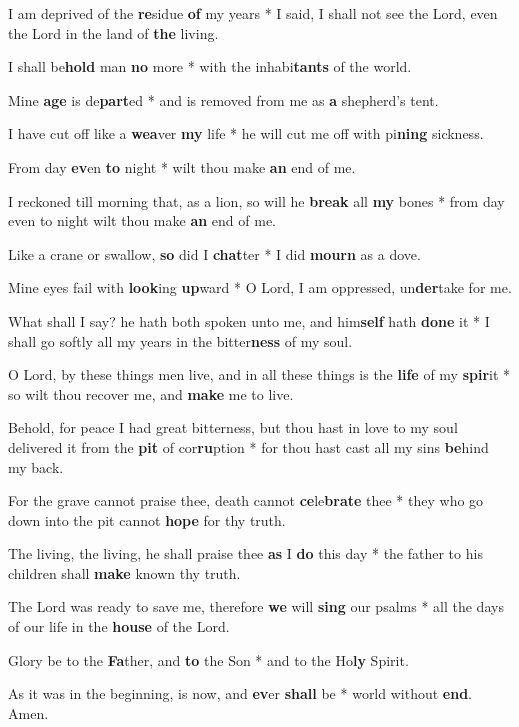 \begin{multicols}{2}
	I am deprived of the \textbf{re}sidue \textbf{of} my years * I said, I shall not see the Lord, even the Lord in the land of \textbf{the} living.
	
	I shall be\textbf{hold} man \textbf{no} more * with the inhabi\textbf{tants} of the world.
	
	Mine \textbf{age} is de\textbf{part}ed * and is removed from me as \textbf{a} shepherd's tent.
	
	I have cut off like a \textbf{wea}ver \textbf{my} life * he will cut me off with pi\textbf{ning} sickness.
	
	From day \textbf{ev}en \textbf{to} night * wilt thou make \textbf{an} end of me.
	
	I reckoned till morning that, as a lion, so will he \textbf{break} all \textbf{my} bones * from day even to night wilt thou make \textbf{an} end of me.
	
	Like a crane or swallow, \textbf{so} did I \textbf{chat}ter * I did \textbf{mourn} as a dove.
	
	Mine eyes fail with \textbf{look}ing \textbf{up}ward * O Lord, I am oppressed, un\textbf{der}take for me.
	
	What shall I say? he hath both spoken unto me, and him\textbf{self} hath \textbf{done} it * I shall go softly all my years in the bitter\textbf{ness} of my soul.
	
	O Lord, by these things men live, and in all these things is the \textbf{life} of my \textbf{spir}it * so wilt thou recover me, and \textbf{make} me to live.
	
	Behold, for peace I had great bitterness, but thou hast in love to my soul delivered it from the \textbf{pit} of cor\textbf{ru}ption * for thou hast cast all my sins \textbf{be}hind my back.
	
	For the grave cannot praise thee, death cannot \textbf{ce}le\textbf{brate} thee * they who go down into the pit cannot \textbf{hope} for thy truth.
	
	The living, the living, he shall praise thee \textbf{as} I \textbf{do} this day * the father to his children shall \textbf{make} known thy truth.
	
	The Lord was ready to save me, therefore \textbf{we} will \textbf{sing} our psalms * all the days of our life in the \textbf{house} of the Lord.
	
	Glory be to the \textbf{Fa}ther, and \textbf{to} the Son * and to the Ho\textbf{ly} Spirit.
	
	As it was in the beginning, is now, and \textbf{ev}er \textbf{shall} be * world without \textbf{end}. Amen.
\end{multicols}